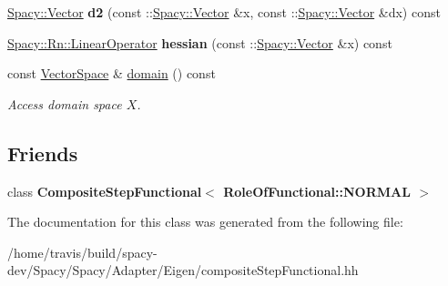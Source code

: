 \begin{DoxyCompactItemize}
\item 
\hypertarget{classSpacy_1_1Rn_1_1CompositeStepFunctional_aa049e713c6bc06fc271257af31c536c7}{\hyperlink{classSpacy_1_1Vector}{Spacy\-::\-Vector} {\bfseries d2} (const \-::\hyperlink{classSpacy_1_1Vector}{Spacy\-::\-Vector} \&x, const \-::\hyperlink{classSpacy_1_1Vector}{Spacy\-::\-Vector} \&dx) const }\label{classSpacy_1_1Rn_1_1CompositeStepFunctional_aa049e713c6bc06fc271257af31c536c7}

\item 
\hypertarget{classSpacy_1_1Rn_1_1CompositeStepFunctional_a0f406c3e04f4374a2e0bfac66ed99fe8}{\hyperlink{classSpacy_1_1Rn_1_1LinearOperator}{Spacy\-::\-Rn\-::\-Linear\-Operator} {\bfseries hessian} (const \-::\hyperlink{classSpacy_1_1Vector}{Spacy\-::\-Vector} \&x) const }\label{classSpacy_1_1Rn_1_1CompositeStepFunctional_a0f406c3e04f4374a2e0bfac66ed99fe8}

\item 
\hypertarget{classSpacy_1_1FunctionalBase_a2d3397deb9fa1ad85ed04e37a03b3aa6}{const \hyperlink{classSpacy_1_1VectorSpace}{Vector\-Space} \& \hyperlink{classSpacy_1_1FunctionalBase_a2d3397deb9fa1ad85ed04e37a03b3aa6}{domain} () const }\label{classSpacy_1_1FunctionalBase_a2d3397deb9fa1ad85ed04e37a03b3aa6}

\begin{DoxyCompactList}\small\item\em Access domain space $X$. \end{DoxyCompactList}\end{DoxyCompactItemize}
\subsection*{Friends}
\begin{DoxyCompactItemize}
\item 
\hypertarget{classSpacy_1_1Rn_1_1CompositeStepFunctional_ab4d23f390bcf90bf58fd77a6dadc9f7e}{class {\bfseries Composite\-Step\-Functional$<$ Role\-Of\-Functional\-::\-N\-O\-R\-M\-A\-L $>$}}\label{classSpacy_1_1Rn_1_1CompositeStepFunctional_ab4d23f390bcf90bf58fd77a6dadc9f7e}

\end{DoxyCompactItemize}


The documentation for this class was generated from the following file\-:\begin{DoxyCompactItemize}
\item 
/home/travis/build/spacy-\/dev/\-Spacy/\-Spacy/\-Adapter/\-Eigen/composite\-Step\-Functional.\-hh\end{DoxyCompactItemize}
